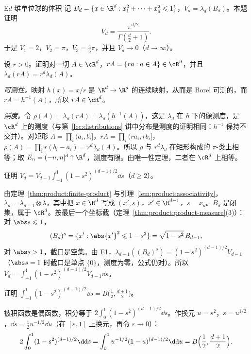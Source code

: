 \begin{probleme}{E}{$d$ 维单位球的体积}
记 $B_d=\{x\in\R^d:x_1^2+\cdots+x_d^2\leqslant1\}$，$V_d=\lambda_d(B_d)$。本题证明
\[
V_d=\frac{\pi^{d/2}}{\Gamma(\frac d2+1)}.
\]
于是 $V_1=2$，$V_2=\pi$，$V_3=\frac43\pi$，并且 $V_d\to0$（$d\to\infty$）。
\begin{questions}
\item 设 $r>0$。证明对一切 $A\in\cR^d$，$rA=\{ra:a\in A\}\in\cR^d$，并且 $\lambda_d(rA)=r^d\lambda_d(A)$。
\begin{solution}
\emph{可测性。}映射 $h(x)=x/r$ 是 $\R^d\to\R^d$ 的连续映射，从而是 Borel 可测的，而 $rA=h^{-1}(A)$，所以 $rA\in\cR^d$。

\emph{测度。}令 $\rho(A)=\lambda_d(rA)=\lambda_d(h^{-1}(A))$，这是 $\lambda_d$ 在 $h$ 下的像测度，是 $\cR^d$ 上的测度（与第~\ref{lec:distributions} 讲中分布是测度的证明相同：$h^{-1}$ 保持不交并）。对矩形 $A=\prod_i(a_i,b_i]$，$rA=\prod_i(ra_i,rb_i]$，$\rho(A)=\prod_ir(b_i-a_i)=r^d\lambda_d(A)$。所以 $\rho$ 与 $r^d\lambda_d$ 在矩形构成的 $\pi$-类上相等；取 $E_n=(-n,n]^d\uparrow\R^d$，测度有限。由唯一性定理，二者在 $\cR^d$ 上相等。
\end{solution}

\item 证明 $V_d=V_{d-1}\int_{-1}^1(1-s^2)^{(d-1)/2}\dd s$（$d\geqslant2$）。
\begin{solution}
由定理~\ref{thm:product:finite-product} 与引理~\ref{lem:product:associativity}，$\lambda_d=\lambda_{d-1}\otimes\lambda$，其中把 $x\in\R^d$ 写成 $(x',s)$，$x'\in\R^{d-1}$，$s=x_d$。$B_d$ 是闭集，属于 $\cR^d$。按最后一个坐标截（定理~\ref{thm:product:product-measure}(3)）：对 $\abs s\leqslant1$，
\[
(B_d)^s=\{x':\abs{x'}^2\leqslant1-s^2\}=\sqrt{1-s^2}\,B_{d-1},
\]
对 $\abs s>1$，截口是空集。由 E1，$\lambda_{d-1}((B_d)^s)=(1-s^2)^{(d-1)/2}V_{d-1}$（$\abs s=1$ 时截口是单点 $\{0\}$，测度为零，公式仍对）。所以 $V_d=\int_{-1}^1(1-s^2)^{(d-1)/2}V_{d-1}\dd s$。
\end{solution}

\item 证明 $\int_{-1}^1(1-s^2)^{(d-1)/2}\dd s=B\bigl(\frac12,\frac{d+1}2\bigr)$。
\begin{solution}
被积函数是偶函数，积分等于 $2\int_0^1(1-s^2)^{(d-1)/2}\dd s$。作换元 $u=s^2$，$s=u^{1/2}$，$\dd s=\frac12u^{-1/2}\dd u$（在 $[\varepsilon,1]$ 上换元，再令 $\varepsilon\to0$）：
\[
2\int_0^1(1-s^2)^{(d-1)/2}\dd s=\int_0^1u^{-1/2}(1-u)^{(d-1)/2}\dd u=B\Bigl(\frac12,\frac{d+1}2\Bigr).
\]
\end{solution}


\end{questions}
\end{probleme}
